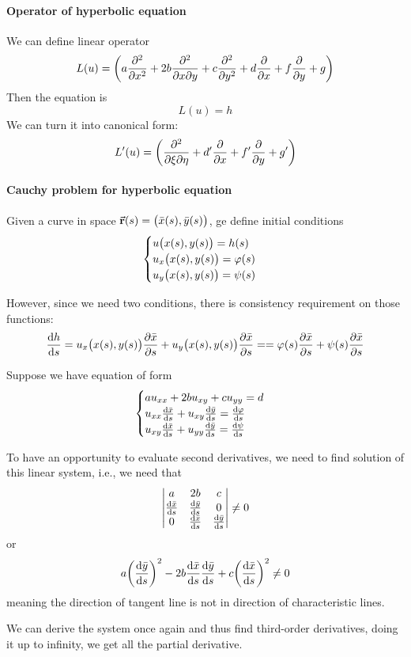 \paragraph{Operator of hyperbolic equation}
We can define linear operator
$$L(u) = \qty(a\pdv[2]{x}+2b\pdv{}{x}{y} + c \pdv[2]{y} + d\pdv{x} + f\pdv{y} + g)$$
Then the equation is
$$L(u) = h$$
We can turn it into canonical form:
$$L'(u) = \qty(\pdv{}{\xi}{\eta}  + d'\pdv{x} + f'\pdv{y} + g') $$
\paragraph{Cauchy problem for hyperbolic equation}
Given a curve in space $\va{r}(s) = \qty\big(\bar{x}(s), \bar{y}(s))$, ge define initial conditions
$$\begin{cases}
u\qty\big(x(s),y(s)) = h(s)\\
u_x\qty\big(x(s),y(s)) = \varphi(s)\\
u_y\qty\big(x(s),y(s)) = \psi(s)\\
\end{cases}$$

However, since we need two conditions, there is consistency requirement on those functions:
$$\dv{h}{s} = u_x\qty\big(x(s),y(s)) \pdv{\bar{x}}{s} + u_y\qty\big(x(s),y(s)) \pdv{\bar{x}}{s} = = \varphi(s) \pdv{\bar{x}}{s} + \psi(s) \pdv{\bar{x}}{s}  $$

Suppose we have equation of form
$$\begin{cases}
au_{xx} + 2bu_{xy} + cu_{yy} = d\\
u_{xx} \dv{\bar{x}}{s} + u_{xy} \dv{\bar{y}}{s} = \dv{\varphi}{s}\\
u_{xy} \dv{\bar{x}}{s} + u_{yy} \dv{\bar{y}}{s} = \dv{\psi}{s}
\end{cases}$$

To have an opportunity to evaluate second derivatives, we need to find solution of this linear system, i.e., we need that
$$\begin{vmatrix}
a&2b&c\\\dv{\bar{x}}{s}& \dv{\bar{y}}{s}&0\\0 &\dv{\bar{x}}{s}& \dv{\bar{y}}{s}
\end{vmatrix} \neq 0$$
or
$$a\qty(\dv{\bar{y}}{s})^2 - 2b\dv{\bar{x}}{s}\dv{\bar{y}}{s} + c\qty(\dv{\bar{x}}{s})^2 \neq 0$$
meaning the direction of tangent line is not in direction of characteristic lines.

We can derive the system once again and thus find third-order derivatives, doing it up to infinity, we get all the partial derivative.
